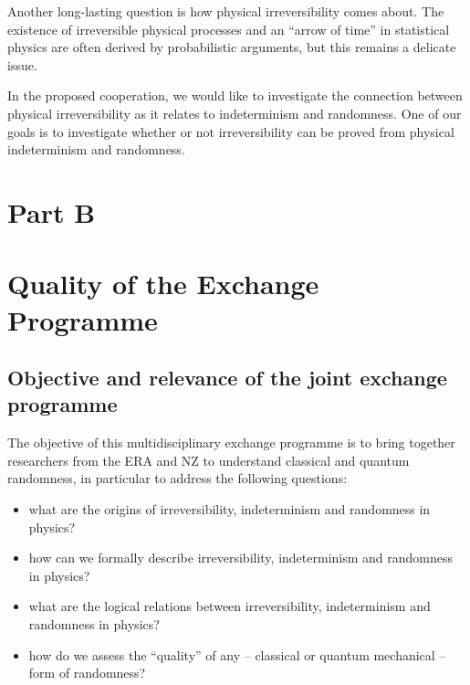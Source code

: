 \documentclass[12pt]{article}
\begin{document}
Another long-lasting question is how physical irreversibility comes about. The existence of irreversible physical processes and an ``arrow of time'' in statistical physics are often derived by probabilistic arguments, but this remains a delicate issue.

In the proposed cooperation, we would like to investigate the connection between physical irreversibility as it relates to indeterminism and randomness. One of our goals is to investigate whether or not irreversibility can be proved from physical indeterminism and randomness.


\newpage


\pagestyle{main}


\section*{Part B}



\section{Quality of the Exchange Programme}


\subsection{Objective and relevance of the joint exchange programme}

The objective of this multidisciplinary exchange programme is
to bring together researchers from the ERA and NZ to understand classical and quantum randomness,
in particular to address the following questions:
\begin{itemize}
\item  what are the origins of irreversibility, indeterminism and randomness in physics?
\item   how can we formally  describe  irreversibility, indeterminism and randomness in physics?
\item what are the logical relations between  irreversibility, indeterminism and randomness in physics?
\item how do we assess the ``quality'' of any -- classical or quantum mechanical -- form of randomness?
\end{itemize}
\end{document}

